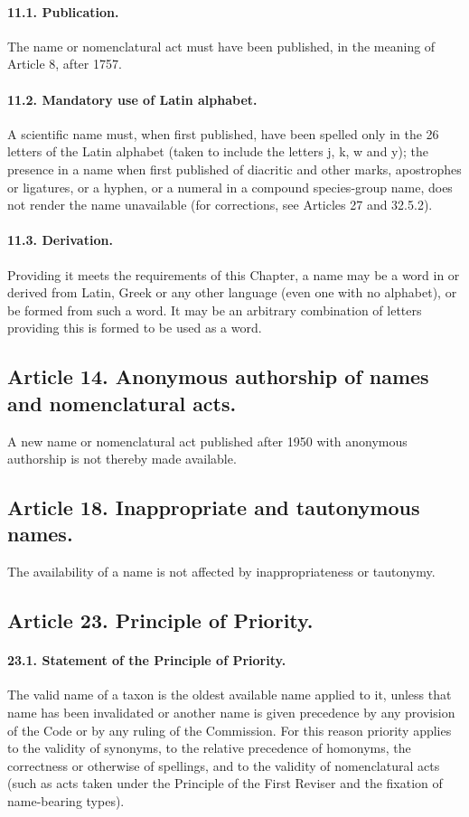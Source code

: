 \paragraph*{11.1. Publication.} The name or nomenclatural act must have been published, in the meaning of Article 8, after 1757.

\paragraph*{11.2. Mandatory use of Latin alphabet.} A scientific name must, when first published, have been spelled only in the 26 letters of the Latin alphabet (taken to include the letters j, k, w and y); the presence in a name when first published of diacritic and other marks, apostrophes or ligatures, or a hyphen, or a numeral in a compound species-group name, does not render the name unavailable (for corrections, see Articles 27 and 32.5.2).

\paragraph*{11.3. Derivation.} Providing it meets the requirements of this Chapter, a name may be a word in or derived from Latin, Greek or any other language (even one with no alphabet), or be formed from such a word. It may be an arbitrary combination of letters providing this is formed to be used as a word.

\subsection*{Article 14. Anonymous authorship of names and nomenclatural acts.}
A new name or nomenclatural act published after 1950 with anonymous authorship is not thereby made available.

\subsection*{Article 18. Inappropriate and tautonymous names.}
The availability of a name is not affected by inappropriateness or tautonymy.

\subsection*{Article 23. Principle of Priority.}

\paragraph*{23.1. Statement of the Principle of Priority.} The valid name of a taxon is the oldest available name applied to it, unless that name has been invalidated or another name is given precedence by any provision of the Code or by any ruling of the Commission. For this reason priority applies to the validity of synonyms, to the relative precedence of homonyms, the correctness or otherwise of spellings, and to the validity of nomenclatural acts (such as acts taken under the Principle of the First Reviser and the fixation of name-bearing types).

